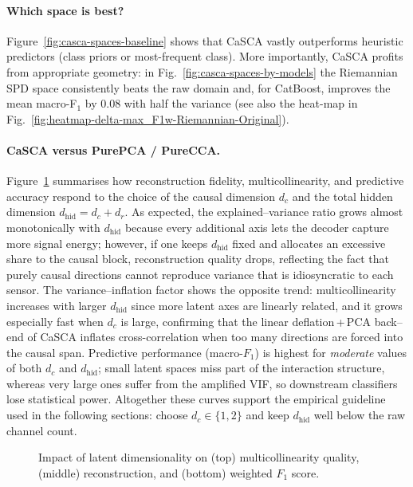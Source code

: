 \documentclass[14pt]{extarticle}
\begin{document}
	\paragraph{Which space is best?}
	Figure~\ref{fig:casca-spaces-baseline} shows that CaSCA vastly
	outperforms heuristic predictors (class priors or most-frequent
	class).  
	More importantly, CaSCA profits from appropriate geometry: in
	Fig.~\ref{fig:casca-spaces-by-models} the Riemannian SPD space
	consistently beats the raw domain and, for CatBoost, improves the mean
	macro-F$_1$ by $0.08$ with half the variance
	(see also the heat-map in
	Fig.~\ref{fig:heatmap-delta-max_F1w-Riemannian-Original}).
	
	\paragraph{CaSCA versus PurePCA / PureCCA.}
	Figure~\ref{fig:other_models} summarises how reconstruction fidelity, multicollinearity, and predictive accuracy respond to the choice of the causal dimension $d_c$ and the total hidden dimension $d_{\mathrm{hid}}=d_c+d_r$.  
	As expected, the explained–variance ratio grows almost monotonically with $d_{\mathrm{hid}}$ because every additional axis lets the decoder capture more signal energy; however, if one keeps $d_{\mathrm{hid}}$ fixed and allocates an excessive share to the causal block, reconstruction quality drops, reflecting the fact that purely causal directions cannot reproduce variance that is idiosyncratic to each sensor.  
	The variance–inflation factor shows the opposite trend: multicollinearity increases with larger $d_{\mathrm{hid}}$ since more latent axes are linearly related, and it grows especially fast when $d_c$ is large, confirming that the linear deflation\,+\,PCA back–end of CaSCA inflates cross-correlation when too many directions are forced into the causal span.  
	Predictive performance (macro-\(F_1\)) is highest for \emph{moderate} values of both $d_c$ and $d_{\mathrm{hid}}$; small latent spaces miss part of the interaction structure, whereas very large ones suffer from the amplified VIF, so downstream classifiers lose statistical power.  Altogether these curves support the empirical guideline used in the following sections: choose $d_c\!\in\!\{1,2\}$ and keep $d_{\mathrm{hid}}$ well below the raw channel count.
	
	\begin{figure}[bhtp]
		\centering
		\par
		\par
		\caption{Impact of latent dimensionality on (top) multicollinearity quality, (middle) reconstruction, and (bottom) weighted $F_1$ score.}
		\label{fig:other_models}
	\end{figure}
\end{document}
